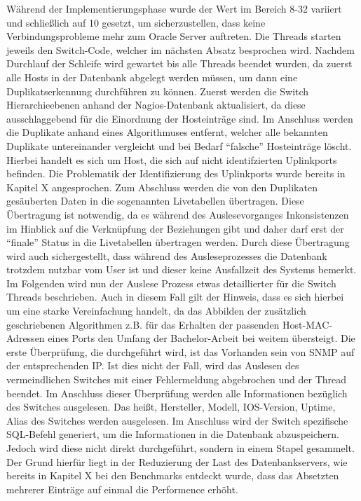Während der Implementierungsphase wurde der Wert im Bereich 8-32 variiert und schließlich auf 10 gesetzt, um sicherzustellen, dass keine Verbindungsprobleme mehr zum Oracle Server auftreten. Die Threads starten jeweils den Switch-Code, welcher im nächsten Absatz besprochen wird. Nachdem Durchlauf der Schleife wird gewartet bis alle Threads beendet wurden, da zuerst alle Hosts in der Datenbank abgelegt werden müssen, um dann eine Duplikatserkennung durchführen zu können. Zuerst werden die Switch Hierarchieebenen anhand der Nagios-Datenbank aktualisiert, da diese ausschlaggebend für die Einordnung der Hosteinträge sind. Im Anschluss werden die Duplikate anhand eines Algorithmuses entfernt, welcher alle bekannten Duplikate untereinander vergleicht und bei Bedarf “falsche” Hosteinträge löscht. Hierbei handelt es sich um Host, die sich auf nicht identifzierten Uplinkports befinden. Die Problematik der Identifizierung des Uplinkports wurde bereits in Kapitel X angesprochen. Zum Abschluss werden die von den Duplikaten gesäuberten Daten in die sogenannten Livetabellen übertragen. Diese Übertragung ist notwendig, da es während des Auslesevorganges Inkonsistenzen im Hinblick auf die Verknüpfung der Beziehungen gibt und daher darf erst der “finale” Status in die Livetabellen übertragen werden. Durch diese Übertragung wird auch sichergestellt, dass während des Ausleseprozesses die Datenbank trotzdem nutzbar vom User ist und dieser keine Ausfallzeit des Systems bemerkt.\\
Im Folgenden wird nun der Auslese Prozess etwas detaillierter für die Switch Threads beschrieben. Auch in diesem Fall gilt der Hinweis, dass es sich hierbei um eine starke Vereinfachung handelt, da das Abbilden der zusätzlich geschriebenen Algorithmen z.B. für das Erhalten der passenden Host-MAC-Adressen eines Ports den Umfang der Bachelor-Arbeit bei weitem übersteigt. 
Die erste Überprüfung, die durchgeführt wird, ist das Vorhanden sein von SNMP auf der entsprechenden IP.
Ist dies nicht der Fall, wird das Auslesen des vermeindlichen Switches mit einer Fehlermeldung abgebrochen und der Thread beendet.
Im Anschluss dieser Überprüfung werden alle Informationen bezüglich des Switches ausgelesen.
Das heißt, Hersteller, Modell, IOS-Version, Uptime, Alias des Switches werden ausgelesen.
Im Anschluss wird der Switch spezifische SQL-Befehl generiert, um die Informationen in die Datenbank abzuspeichern.
Jedoch wird diese nicht direkt durchgeführt, sondern in einem Stapel gesammelt. Der Grund hierfür liegt in der Reduzierung der Last des Datenbankservers, wie bereits in Kapitel X bei den Benchmarks entdeckt wurde, dass das Absetzten mehrerer Einträge auf einmal die Performence erhöht.
